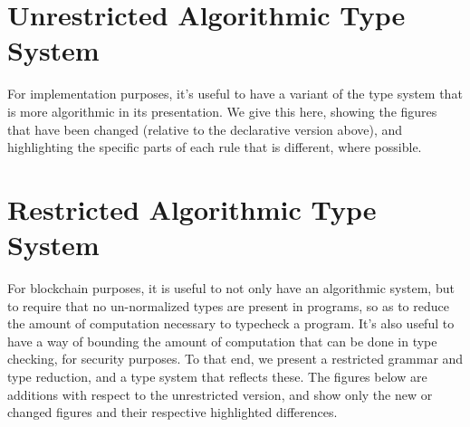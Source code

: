 \documentclass[a4paper]{article}
\begin{document}
%


%



\section{Unrestricted Algorithmic Type System}

For implementation purposes, it's useful to have a variant of the type
system that is more algorithmic in its presentation. We give this
here, showing the figures that have been changed (relative to the
declarative version above), and highlighting the specific parts of
each rule that is different, where possible.





\section{Restricted Algorithmic Type System}

For blockchain purposes, it is useful to not only have an algorithmic
system, but to require that no un-normalized types are present in
programs, so as to reduce the amount of computation necessary to
typecheck a program. It's also useful to have a way of bounding the
amount of computation that can be done in type checking, for security
purposes. To that end, we present a restricted grammar and type
reduction, and a type system that reflects these. The figures below
are additions with respect to the unrestricted version, and show only
the new or changed figures and their respective highlighted
differences.








\end{document}

